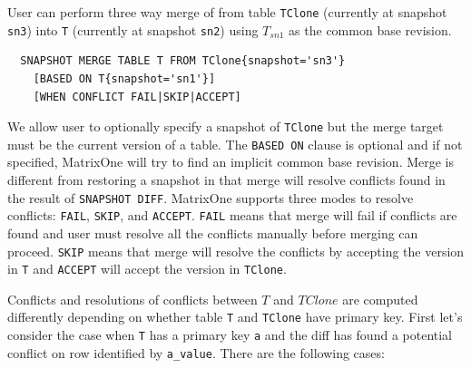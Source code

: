 \documentclass[sigconf,nonacm]{acmart} %
\begin{document}
User can perform three way merge of from table 
\texttt{TClone} (currently at snapshot \texttt{sn3}) 
into \texttt{T} (currently at snapshot \texttt{sn2}) 
using $T_{sn1}$ as the common base revision. 
\begin{verbatim}
  SNAPSHOT MERGE TABLE T FROM TClone{snapshot='sn3'}
    [BASED ON T{snapshot='sn1'}]
    [WHEN CONFLICT FAIL|SKIP|ACCEPT]
\end{verbatim}
We allow user to optionally specify a snapshot of \texttt{TClone} 
but the merge target must be the current version of a table.
The \texttt{BASED ON} clause is optional and if not specified, MatrixOne will try to 
find an implicit common base revision.  Merge is different from restoring a snapshot in 
that merge will resolve conflicts found in the result of \texttt{SNAPSHOT DIFF}.
MatrixOne supports three modes to resolve conflicts: \texttt{FAIL}, \texttt{SKIP}, 
and \texttt{ACCEPT}.  \texttt{FAIL} means that merge will fail if conflicts are found
and user must resolve all the conflicts manually before merging can proceed.  
\texttt{SKIP} means that merge will resolve the conflicts by accepting 
the version in \texttt{T} and \texttt{ACCEPT} will accept the version in \texttt{TClone}.  

Conflicts and resolutions of conflicts between $T$ and $TClone$
are computed differently depending on whether table \texttt{T} and \texttt{TClone} 
have primary key.
First let's consider the case when \texttt{T} has a primary key \texttt{a} and the diff has
found a potential conflict on row identified by \texttt{a\_value}.  
There are the following cases:
\end{document}
